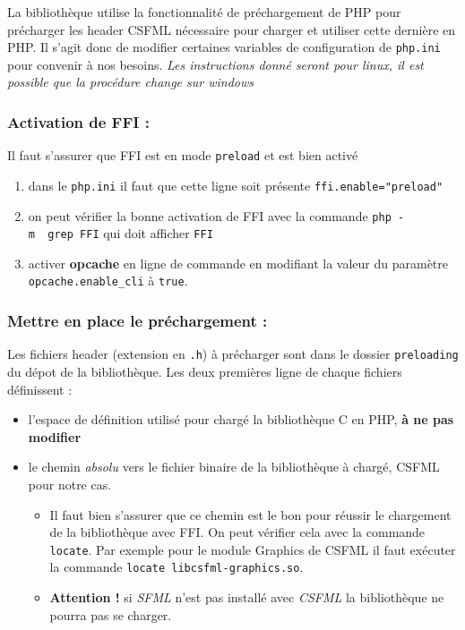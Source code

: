 \documentclass[11pt,a4paper,krantz2,11pt,oneside]{krantz}
\providecommand{\tightlist}{%
  \setlength{\itemsep}{0pt}\setlength{\parskip}{0pt}}
\begin{document}
La bibliothèque utilise la fonctionnalité de préchargement de PHP pour précharger les header CSFML nécessaire pour charger et utiliser cette dernière en PHP. Il s'agit donc de modifier certaines variables de configuration de \texttt{php.ini} pour convenir à nos besoins. \emph{Les instructions donné seront pour linux, il est possible que la procédure change sur windows}

\hypertarget{activation-de-ffi}{%
\subsubsection{Activation de FFI :}\label{activation-de-ffi}}

Il faut s'assurer que FFI est en mode \texttt{preload} et est bien activé

\begin{enumerate}
\def\labelenumi{\arabic{enumi}.}
\item
  dans le \texttt{php.ini} il faut que cette ligne soit présente \texttt{ffi.enable="preload"}
\item
  on peut vérifier la bonne activation de FFI avec la commande \texttt{php\ -m\ \textbar{}\ grep\ FFI} qui doit afficher \texttt{FFI}
\item
  activer \textbf{opcache} en ligne de commande en modifiant la valeur du paramètre \texttt{opcache.enable\_cli} à \texttt{true}.
\end{enumerate}

\hypertarget{mettre-en-place-le-pruxe9chargement}{%
\subsubsection{Mettre en place le préchargement :}\label{mettre-en-place-le-pruxe9chargement}}

Les fichiers header (extension en \texttt{.h}) à précharger sont dans le dossier \texttt{preloading} du dépot de la bibliothèque. Les deux premières ligne de chaque fichiers définissent :

\begin{itemize}
\tightlist
\item
  l'espace de définition utilisé pour chargé la bibliothèque C en PHP, \textbf{à ne pas modifier}
\item
  le chemin \emph{absolu} vers le fichier binaire de la bibliothèque à chargé, CSFML pour notre cas.

  \begin{itemize}
  \tightlist
  \item
    Il faut bien s'assurer que ce chemin est le bon pour réussir le chargement de la bibliothèque avec FFI. On peut vérifier cela avec la commande \texttt{locate}. Par exemple pour le module Graphics de CSFML il faut exécuter la commande \texttt{locate\ libcsfml-graphics.so}.
  \item
    \textbf{Attention !} si \emph{SFML} n'est pas installé avec \emph{CSFML} la bibliothèque ne pourra pas se charger.
  \end{itemize}
\end{itemize}
\end{document}
